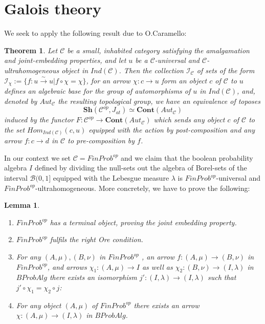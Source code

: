 \documentclass[a4paper,draft]{amsproc}
\theoremstyle{plain}
\newtheorem{theorem}{Theorem}[section]
\newtheorem{lemma}{Lemma}[section]
\theoremstyle{definition}
\theoremstyle{remark}
\numberwithin{equation}{section}
\begin{document}
\section{Galois theory}
We seek to apply the following result due to O.Caramello:
\begin{theorem}\label{olivia}
Let $\mathcal{C}$ be a small, inhabited category satisfying the amalgamation and joint-embedding properties, and let $u$ be a $\mathcal{C}$-universal and $\mathcal{C}$-ultrahomogeneous object in $Ind(\mathcal{C})$. Then the collection $\mathcal{I}_{\mathcal{C}}$ of sets of the form $\mathcal{I}_{\chi}:=\{f:u\overset{\sim}{\rightarrow} u| f\circ \chi=\chi\} $, for an arrow $\chi:c\rightarrow u$ form an object $c$ of $\mathcal{C}$ to $u$ defines an algebraic base for the group of automorphisms of $u$ in $Ind(\mathcal{C})$, and, denoted by $Aut_\mathcal{C}$ the resulting topological group, we have an equivalence of toposes
\[\textbf{Sh}(\mathcal{C}^{op},J_{at})\simeq \textbf{Cont}(Aut_\mathcal{C}) \]
induced by the functor $F:\mathcal{C}^{op}\rightarrow \textbf{Cont}(Aut_{\mathcal{C}})$ which sends any object $c$ of $\mathcal{C}$ to the set $Hom_{Ind(\mathcal{C})}(c,u)$ equipped with the action by post-composition and any arrow $f:c\rightarrow d$ in $\mathcal{C}$ to pre-composition by $f$.
\end{theorem}
In our context we set $\mathcal{C}=FinProb^{op}$ and we claim that the boolean probability algebra $I$ defined by dividing the null-sets out the algebra of Borel-sets of the interval $\mathcal{B}(0,1]$ equipped with the Lebesgue measure $\lambda$ is  $FinProb^{op}$-universal and $FinProb^{op}$-ultrahomogeneous. More concretely, we have to prove the following:
\begin{lemma}\begin{enumerate}
\item $FinProb^{op}$ has a terminal object, proving the joint embedding property.
\item $FinProb^{op}$ fulfils the right Ore condition.
\item For any $(A,\mu),(B,\nu)$ in $FinProb^{op}$ , an arrow $f:(A,\mu)\rightarrow (B,\nu)$ in \\
 $FinProb^{op}$, and arrows $\chi_1:(A,\mu)\rightarrow I$ as well as $\chi_2:(B,\nu)\rightarrow (I,\lambda)$ in $BProbAlg$ there exists an isomorphism $j':(I,\lambda)\rightarrow (I,\lambda)$ such that $j'\circ \chi_1=\chi_2\circ j$:
 \begin{center}
 \end{center}
\item For any object $(A,\mu)$ of $FinProb^{op}$ there exists an arrow $\chi:(A,\mu)\rightarrow (I,\lambda)$ in $BProbAlg$.
\end{enumerate}
\end{lemma}
\end{document}

